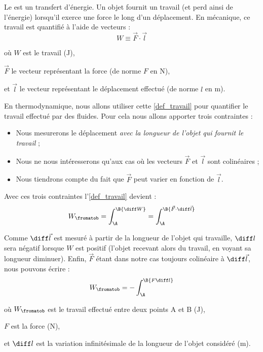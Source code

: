 	Le  est un transfert d’énergie. Un objet fournit un travail (et perd ainsi de l’énergie) lorsqu’il exerce une force le long d’un déplacement. En mécanique, ce travail est quantifié à l’aide de vecteurs :
	\begin{equation}
		W \equiv \vec F \cdot \vec l
		\label{def_travail}
	\end{equation}
	\begin{equationterms}		
		\item où \tab $W$ 		\tab est le travail (\si{\joule}),
		\item 	\tab $\vec F$ 	\tab le vecteur représentant la force (de norme $F$ en \si{\newton}),
		\item et \tab $\vec l$ 	\tab le vecteur représentant le déplacement effectué (de norme $l$ en \si{\metre}).
	\end{equationterms}

	En thermodynamique, nous allons utiliser cette \cref{def_travail} pour quantifier le travail effectué par des fluides. Pour cela nous allons apporter trois contraintes :
	
	\begin{itemize}
		\item Nous mesurerons le déplacement \emph{avec la longueur de l’objet qui fournit le travail} ;
		\item Nous ne nous intéresserons qu’aux cas où les vecteurs $\vec F$ et $\vec l$ sont colinéaires ;
		\item Nous tiendrons compte du fait que $\vec F$ peut varier en fonction de $\vec l$.
	\end{itemize}


	Avec ces trois contraintes l’\cref{def_travail} devient :
		\begin{equation*}
		W_\fromatob = \int_\A^\B {\diff W} = \int_\A^\B {\vec F \cdot \diff \vec l}
		\end{equation*}

	Comme $\diff \vec l$ est mesuré à partir de la longueur de l’objet qui travaille, $\diff l$ sera négatif lorsque $W$ est positif (l’objet recevant alors du travail, en voyant sa longueur diminuer). Enfin, $\vec F$ étant dans notre cas toujours colinéaire à $\diff \vec l$, nous pouvons écrire :
		\begin{equation}
		W_\fromatob = -\int_\A^\B {F \diff l}
		\label{eq_travail_fdl}
		\end{equation}
	\begin{equationterms}		
		\item où \tab $W_\fromatob$ 	\tab est le travail effectué entre deux points A et B (\si{\joule}),
		\item 	\tab $F$ 				\tab est la force (\si{\newton}),
		\item et \tab $\diff l$ 		\tab est la variation infinitésimale de la longueur de l’objet considéré (\si{\metre}).
	\end{equationterms}

